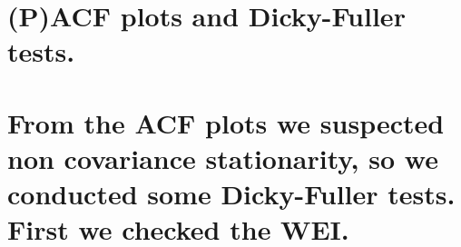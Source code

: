 \documentclass[]{article}
\newenvironment{Shaded}{\begin{snugshade}}{\end{snugshade}}
\newcommand{\KeywordTok}[1]{\textcolor[rgb]{0.13,0.29,0.53}{\textbf{#1}}}
\newcommand{\DataTypeTok}[1]{\textcolor[rgb]{0.13,0.29,0.53}{#1}}
\newcommand{\DecValTok}[1]{\textcolor[rgb]{0.00,0.00,0.81}{#1}}
\newcommand{\StringTok}[1]{\textcolor[rgb]{0.31,0.60,0.02}{#1}}
\newcommand{\OperatorTok}[1]{\textcolor[rgb]{0.81,0.36,0.00}{\textbf{#1}}}
\newcommand{\NormalTok}[1]{#1}
\begin{document}
\begin{Shaded}
\end{Shaded}

\section{(P)ACF plots and Dicky-Fuller
tests.}\label{pacf-plots-and-dicky-fuller-tests.}

\begin{Shaded}
\end{Shaded}

\section{From the ACF plots we suspected non covariance stationarity, so
we conducted some Dicky-Fuller tests. First we checked the
WEI.}\label{from-the-acf-plots-we-suspected-non-covariance-stationarity-so-we-conducted-some-dicky-fuller-tests.-first-we-checked-the-wei.}
\end{document}
